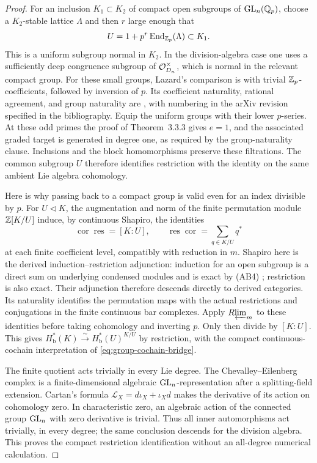 \begin{proof}
For an inclusion \(K_1\subset K_2\) of compact open subgroups of
\(\operatorname{GL}_n(\mathbb Q_p)\), choose a \(K_2\)-stable lattice \(\Lambda\) and then
\(r\) large enough that
\[
 U=1+p^r\operatorname{End}_{\mathbb Z_p}(\Lambda)\subset K_1.
\]
This is a uniform subgroup normal in \(K_2\). In the division-algebra
case one uses a sufficiently deep congruence subgroup of
\(\mathcal O_{D_n}^{\times}\), which is normal in the relevant compact group.
For these small groups, Lazard's comparison is
\cite[Theorem~3.3.3 and Remark~3.3.4]{HKN2011} with trivial
\(\mathbb Z_p\)-coefficients, followed by inversion of \(p\).
Its coefficient naturality, rational agreement, and group naturality are
\cite[Theorem~3.1.1(1)--(3)]{HKN2011}, with numbering in the arXiv
revision specified in the bibliography. Equip the uniform groups with
their lower \(p\)-series. At these odd primes the proof of
Theorem~3.3.3 gives \(e=1\), and the associated graded target is generated
in degree one, as required by the group-naturality clause. Inclusions and
the block homomorphisms preserve these filtrations. The common subgroup
\(U\) therefore identifies restriction with the identity on the same
ambient Lie algebra cohomology.

Here is why passing back to a compact group is valid even for an index
divisible by \(p\). For \(U\triangleleft K\), the augmentation and norm
of the finite permutation module \(\mathbb Z[K/U]\) induce, by continuous
Shapiro, the identities
\[
 \operatorname{cor}\operatorname{res}=[K:U],\qquad
 \operatorname{res}\operatorname{cor}
      =\sum_{q\in K/U}q^*
\]
at each finite coefficient level, compatibly with reduction in \(m\).
Shapiro here is the derived induction--restriction adjunction: induction
for an open subgroup is a direct sum on underlying condensed modules and
is exact by (AB4) \cite[Theorems~2.2 and~2.4]{Tang2026}; restriction is
also exact. Their adjunction therefore descends directly to derived
categories. Its naturality identifies the
permutation maps with the actual restrictions and conjugations in the
finite continuous bar complexes. Apply \(R\!\varprojlim_m\) to these identities
before taking cohomology and inverting \(p\). Only then divide by
\([K:U]\). This gives
\(H^*_{\mathrm b}(K)\xrightarrow{\sim}H^*_{\mathrm b}(U)^{K/U}\)
by restriction, with the compact
continuous-cochain interpretation of \eqref{eq:group-cochain-bridge}.

The finite quotient acts trivially in every Lie degree. The
Chevalley--Eilenberg complex is a finite-dimensional algebraic
\(\operatorname{GL}_n\)-representation after a splitting-field extension. Cartan's
formula \(\mathcal L_X=d\iota_X+\iota_Xd\) makes the derivative of its
action on cohomology zero. In characteristic zero, an algebraic action
of the connected group \(\operatorname{GL}_n\) with zero derivative is trivial.
Thus all inner automorphisms act trivially, in every degree; the same
conclusion descends for the division algebra. This proves the compact
restriction identification without an all-degree numerical calculation.


\end{proof}
